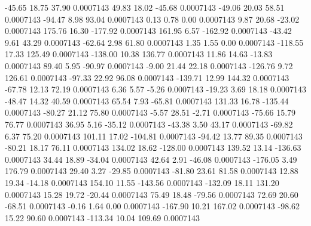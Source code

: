       -45.65       18.75       37.90     0.0007143
       49.83       18.02      -45.68     0.0007143
      -49.06       20.03       58.51     0.0007143
      -94.47        8.98       93.04     0.0007143
        0.13        0.78        0.00     0.0007143
        9.87       20.68      -23.02     0.0007143
      175.76       16.30     -177.92     0.0007143
      161.95        6.57     -162.92     0.0007143
      -43.42        9.61       43.29     0.0007143
      -62.64        2.98       61.80     0.0007143
        1.35        1.55        0.00     0.0007143
     -118.55       17.33      125.49     0.0007143
     -138.00       10.38      136.77     0.0007143
       11.86       14.63      -13.83     0.0007143
       89.40        5.95      -90.97     0.0007143
       -9.00       21.44       22.18     0.0007143
     -126.76        9.72      126.61     0.0007143
      -97.33       22.92       96.08     0.0007143
     -139.71       12.99      144.32     0.0007143
      -67.78       12.13       72.19     0.0007143
        6.36        5.57       -5.26     0.0007143
      -19.23        3.69       18.18     0.0007143
      -48.47       14.32       40.59     0.0007143
       65.54        7.93      -65.81     0.0007143
      131.33       16.78     -135.44     0.0007143
      -80.27       21.12       75.80     0.0007143
       -5.57       28.51       -2.71     0.0007143
      -75.66       15.79       76.77     0.0007143
       36.95        5.16      -35.12     0.0007143
      -43.38        3.50       43.17     0.0007143
      -69.82        6.37       75.20     0.0007143
      101.11       17.02     -104.81     0.0007143
      -94.42       13.77       89.35     0.0007143
      -80.21       18.17       76.11     0.0007143
      134.02       18.62     -128.00     0.0007143
      139.52       13.14     -136.63     0.0007143
       34.44       18.89      -34.04     0.0007143
       42.64        2.91      -46.08     0.0007143
     -176.05        3.49      176.79     0.0007143
       29.40        3.27      -29.85     0.0007143
      -81.80       23.61       81.58     0.0007143
       12.88       19.34      -14.18     0.0007143
      154.10       11.55     -143.56     0.0007143
     -132.09       18.11      131.20     0.0007143
       15.28       19.72      -20.44     0.0007143
       75.49       18.48      -79.56     0.0007143
       72.69       20.60      -68.51     0.0007143
       -0.16        1.64        0.00     0.0007143
     -167.90       10.21      167.02     0.0007143
      -98.62       15.22       90.60     0.0007143
     -113.34       10.04      109.69     0.0007143
